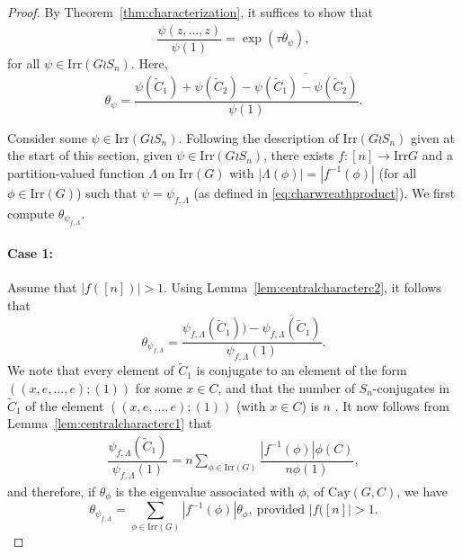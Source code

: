 \documentclass[10pt,a4paper]{amsart}
\newcommand{\irr}{\mathrm{Irr}}
\newcommand{\mrm}{\mathrm}
\newcommand{\ov}{\overline}
\begin{document}
\begin{proof}
By Theorem~\ref{thm:characterization}, it suffices to show that 
\[\dfrac{\ov{\psi(z,\ldots, z ) }}{\psi(1)} = \exp\left(\tau \theta_{\psi}\right),\] for all $\psi \in \irr(G \wr S_{n})$. Here,
 \begin{equation}\label{eq:tpsiwr}
\theta_{\psi} = \dfrac{\psi(\tilde{C}_{1})+\psi(\tilde{C}_{2})-\ov{\psi(\tilde{C}_{1})-\psi(\tilde{C}_{2})}}{\psi(1)}.
\end{equation}

Consider some $\psi \in \irr(G \wr S_{n})$.
Following the description of $\irr(G \wr S_{n})$ given at the start of this section, given $\psi \in \irr(G\wr S_{n})$, there exists $f:[n] \to \irr{G}$ and a partition-valued function $\Lambda$ on $\irr(G)$ with $|\Lambda(\phi)|=|f^{-1}(\phi)|$ (for all $\phi \in \irr(G)$) such that $\psi=\psi_{f,\Lambda}$ (as defined in \eqref{eq:charwreathproduct}). We first compute $\theta_{\psi_{f,\Lambda}}$.

\paragraph{Case 1:} Assume that $|f([n])|>1$. Using Lemma~\ref{lem:centralcharacterc2}, it follows that
\[\theta_{\psi_{f, \Lambda}} = \dfrac{\psi_{f, \Lambda}(\tilde{C}_{1}))-\ov{\psi_{f, \Lambda}(\tilde{C}_{1})}}{\psi_{f, \Lambda}(1)}.\] We note that every element of $\tilde{C}_{1}$ is conjugate to an element of the form $((x,e,\ldots ,e) ; (1))$ for some $x\in C$, and that the number of $S_{n}$-conjugates in $\tilde{C}_{1}$ of the element $((x,e,\ldots ,e) ; (1))$ (with $x \in C$) is $n$ . It now follows from Lemma~\ref{lem:centralcharacterc1} that 
\begin{align*}
\dfrac{\psi_{f, \Lambda}(\tilde{C}_{1})}{\psi_{f, \Lambda}(1)} = n\sum\limits_{\phi \in \irr(G)}  \dfrac{|f^{-1}(\phi)|\phi(C)}{n\phi(1)},
\end{align*}
and therefore, if $\theta_{\phi}$ is the eigenvalue associated with $\phi$, of $\mrm{Cay}(G,C)$, we have
\begin{equation}\label{eq:c1sum}
\theta_{\psi_{f, \Lambda}} = \sum\limits_{\phi \in \irr(G)} |f^{-1}(\phi)| \theta_{\phi},\ \text{provided $|f([n]|>1$.}
\end{equation}


\end{proof}
\end{document}
